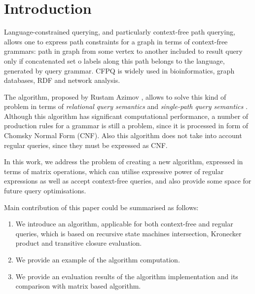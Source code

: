 \section{Introduction}


Language-constrained querying, and particularly context-free path querying, allows one to express path constraints for a graph in terms of context-free grammars: path in graph from some vertex to another included to result query only if concatenated set o labels along this path belongs to the language, generated by query grammar. CFPQ is widely used in bioinformatics, graph databases, RDF and network analysis. 

The algorithm, proposed by Rustam Azimov \cite{Azimov:2018:CPQ:3210259.3210264}, 
allows to solve this kind of problem in terms of \textit{relational query semantics} \cite{Hellings2014ConjunctiveCP} and \textit{single-path query semantics} \cite{hellings2015querying}. Although this algorithm has significant computational performance, a number of production rules for a grammar is still a problem, since it is processed in form of Chomsky Normal Form (CNF). Also this algorithm does not take into account regular queries, since they must be expressed as CNF.

In this work, we address the problem of creating a new algorithm, expressed in terms of matrix operations, which can utilise expressive power of regular expressions as well as accept context-free queries, and also provide some space for future query optimisations.

Main contribution of this paper could be summarised as follows:

\begin{enumerate}
\item We introduce an algorithm, applicable for both context-free and regular queries, which is based on recursive state machines intersection, Kronecker product and transitive closure evaluation.
\item We provide an example of the algorithm computation.
\item We provide an evaluation results of the algorithm implementation and its comparison with matrix based algorithm. 
\end{enumerate}

